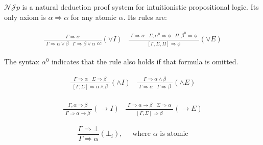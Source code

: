 \documentclass[12pt]{article}
\begin{document}
$\mathcal{NJ}p$ is a natural deduction proof system for intuitionistic propositional logic.  Its only axiom is $\alpha\Rightarrow\alpha$ for any atomic $\alpha$.  Its rules are:

$$\begin{array}{cc}
\frac{\begin{array}{c}\Gamma\Rightarrow\alpha\end{array}}{
\begin{array}{cc}
\Gamma\Rightarrow\alpha\vee\beta&
\Gamma\Rightarrow\beta\vee\alpha
\end{array}{cc}}(\vee I)
&
\frac{\begin{array}{ccc}
\Gamma\Rightarrow\alpha&
\Sigma,\alpha^0\Rightarrow\phi&
\Pi,\beta^0\Rightarrow\phi
\end{array}}
{\begin{array}{c}[\Gamma,\Sigma,\Pi]\Rightarrow\phi\end{array}}(\vee E)
\end{array}$$

The syntax $\alpha^0$ indicates that the rule also holds if that formula is omitted.


$$\begin{array}{cc}
\frac{\begin{array}{cc}
\Gamma\Rightarrow\alpha&
\Sigma\Rightarrow\beta
\end{array}}{\begin{array}{c}
[\Gamma,\Sigma]\Rightarrow\alpha\wedge\beta\end{array}}(\wedge I)
&
\frac{\begin{array}{c}\Gamma\Rightarrow\alpha\wedge\beta\end{array}}
{\begin{array}{cc}
\Gamma\Rightarrow\alpha&
\Gamma\Rightarrow\beta
\end{array}}(\wedge E)
\end{array}$$

$$\begin{array}{cc}
\frac{\begin{array}{c}\Gamma,\alpha\Rightarrow\beta\end{array}}{
\begin{array}{c}\Gamma\Rightarrow\alpha\rightarrow\beta\end{array}}(\rightarrow I)
&
\frac{\begin{array}{cc}
\Gamma\Rightarrow\alpha\rightarrow\beta&
\Sigma\Rightarrow\alpha
\end{array}}
{\begin{array}{c}[\Gamma,\Sigma]\Rightarrow\beta\end{array}}(\rightarrow E)
\end{array}$$

$$\frac{\Gamma\Rightarrow\bot}{\Gamma\Rightarrow\alpha}(\bot_i),\quad \text{ where }\alpha\text{ is atomic}$$
\end{document}
